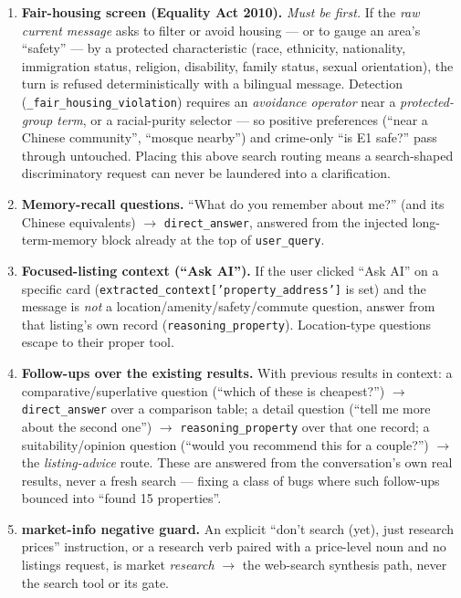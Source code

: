 \documentclass[11pt,a4paper]{article}
\newcommand{\code}[1]{\texttt{\small #1}}
\begin{document}
\begin{enumerate}[leftmargin=1.6em,itemsep=3pt]
  \item \textbf{Fair-housing screen (Equality Act 2010).} \emph{Must be first.} If the
  \emph{raw current message} asks to filter or avoid housing --- or to gauge an area's
  ``safety'' --- by a protected characteristic (race, ethnicity, nationality,
  immigration status, religion, disability, family status, sexual orientation), the
  turn is refused deterministically with a bilingual message. Detection
  (\code{\_fair\_housing\_violation}) requires an \emph{avoidance operator} near a
  \emph{protected-group term}, or a racial-purity selector --- so positive
  preferences (``near a Chinese community'', ``mosque nearby'') and crime-only
  ``is E1 safe?'' pass through untouched. Placing this above search routing means a
  search-shaped discriminatory request can never be laundered into a clarification.

  \item \textbf{Memory-recall questions.} ``What do you remember about me?'' (and its
  Chinese equivalents) $\to$ \code{direct\_answer}, answered from the injected
  long-term-memory block already at the top of \code{user\_query}.

  \item \textbf{Focused-listing context (``Ask AI'').} If the user clicked ``Ask AI''
  on a specific card (\code{extracted\_context['property\_address']} is set) and the
  message is \emph{not} a location/amenity/safety/commute question, answer from that
  listing's own record (\code{reasoning\_property}). Location-type questions escape to
  their proper tool.

  \item \textbf{Follow-ups over the existing results.} With previous results in
  context: a comparative/superlative question (``which of these is cheapest?'') $\to$
  \code{direct\_answer} over a comparison table; a detail question (``tell me more
  about the second one'') $\to$ \code{reasoning\_property} over that one record; a
  suitability/opinion question (``would you recommend this for a couple?'') $\to$ the
  \emph{listing-advice} route. These are answered from the conversation's own real
  results, never a fresh search --- fixing a class of bugs where such follow-ups
  bounced into ``found 15 properties''.

  \item \textbf{market-info negative guard.} An explicit ``don't search (yet), just
  research prices'' instruction, or a research verb paired with a price-level noun and
  no listings request, is market \emph{research} $\to$ the web-search synthesis path,
  never the search tool or its gate.


\end{enumerate}
\end{document}
